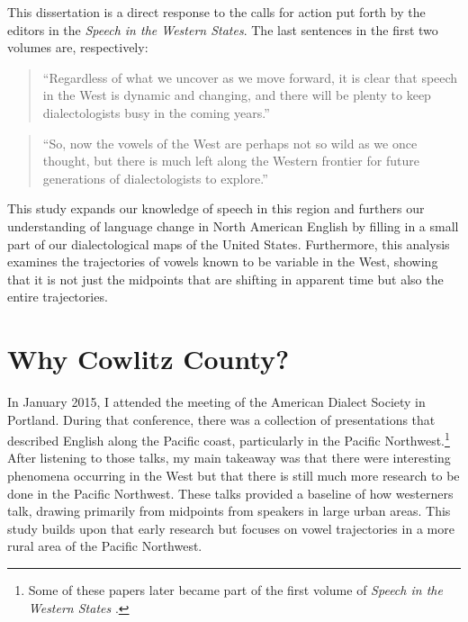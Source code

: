 This dissertation is a direct response to the calls for action put forth by the editors in the \textit{Speech in the Western States}. The last sentences in the first two volumes are, respectively:
\begin{quote}
    ``Regardless of what we uncover as we move forward, it is clear that speech in the West is dynamic and changing, and there will be plenty to keep dialectologists busy in the coming years.'' \citep[164]{fridland_etal_2016_pads}
\end{quote}
\begin{quote}
    ``So, now the vowels of the West are perhaps not so wild as we once thought, but there is much left along the Western frontier for future generations of dialectologists to explore.'' \citep[173]{fridland_etal_2017_pads}
\end{quote}
This study expands our knowledge of speech in this region and furthers our understanding of language change in North American English by filling in a small part of our dialectological maps of the United States. Furthermore, this analysis examines the trajectories of vowels known to be variable in the West, showing that it is not just the midpoints that are shifting in apparent time but also the entire trajectories.


\section{Why Cowlitz County?}
\label{sec:why_cowlitz_county}

In January 2015, I attended the meeting of the American Dialect Society in Portland. During that conference, there was a collection of presentations that described English along the Pacific coast, particularly in the Pacific Northwest.\footnote{Some of these papers later became part of the first volume of \textit{Speech in the Western States} \citep{fridland_etal_2016_pads}.} After listening to those talks, my main takeaway was that there were interesting phenomena occurring in the West but that there is still much more research to be done in the Pacific Northwest. These talks provided a baseline of how westerners talk, drawing primarily from midpoints from speakers in large urban areas. This study builds upon that early research but focuses on vowel trajectories in a more rural area of the Pacific Northwest.

